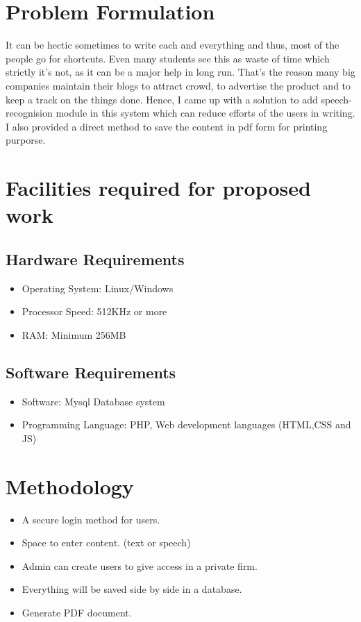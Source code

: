 
\section{Problem Formulation}
It can be hectic sometimes to write each and everything and thus, most of the people go for shortcuts. Even many students see this as waste of time which strictly it's not, as it can be a major help in long run. That's the reason many big companies maintain their blogs to attract crowd, to advertise the product and to keep a track on the things done.
\noindent Hence, I came up with a solution to add speech-recognision module in this system which can reduce efforts of the users in writing. I also provided a direct method to save the content in pdf form for printing purporse.

\section{Facilities required for proposed work}
\subsection{Hardware Requirements}
\begin{itemize}
\item Operating System: Linux/Windows
\item Processor Speed: 512KHz or more
\item RAM: Minimum 256MB
\end{itemize}
\subsection{Software Requirements}
\begin{itemize}
\item Software: Mysql Database system
\item Programming Language: PHP, Web development languages (HTML,CSS and JS)
\end{itemize}

\section{Methodology}
\begin{itemize}
\item A secure login method for users.
\item Space to enter content. (text or speech)
\item Admin can create users to give access in a private firm.
\item Everything will be saved side by side in a database.
\item Generate PDF document.
\end{itemize}

